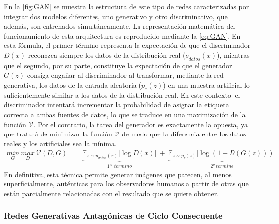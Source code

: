 En la \autoref{fig:GAN} se muestra la estructura de este tipo de redes caracterizadas por integrar dos modelos diferentes, uno generativo y otro discriminativo, que además, son entrenados simultáneamente. La representación matemática del funcionamiento de esta arquitectura es reproducido mediante la \autoref{eq:GAN}. En esta fórmula, el primer término representa la expectación de que el discriminador $D(x)$ reconozca siempre los datos de la distribución real ($p_{datos}(x)$), mientras que el segundo, por su parte, constituye la expectación de que el generador $G(z)$ consiga engañar al discriminador al transformar, mediante la red generativa, los datos de la entrada aleatoria ($p_z(z)$) en una muestra artificial lo suficientemente similar a los datos de la distribución real. En este contexto, el discriminador intentará incrementar la probabilidad de asignar la etiqueta correcta a ambas fuentes de datos, lo que se traduce en una maximización de la función $\mathcal{V}$. Por el contrario, la tarea del generador es exactamente la opuesta, ya que tratará de minimizar la función $\mathcal{V}$ de modo que la diferencia entre los datos reales y los artificiales sea la mínima.
\begin{align} \label{eq:GAN}
    \underset{G}{min} \ \underset{D}{max} \ \mathcal{V}(D, G) &= \underbrace{\mathbb{E}_{x\sim p_{datos}(x)} \big[\log D(x)\big]}_{1^{er} \ t\acute{e}rmino} \ + \ \underbrace{\mathbb{E}_{z\sim p_{z}(z)} \big[\log (1- D(G(z)))\big]}_{2^{o} \ t\acute{e}rmino}
\end{align}
En definitiva, esta técnica permite generar imágenes que parecen, al menos superficialmente, auténticas para los observadores humanos a partir de otras que están parcialmente relacionadas con el resultado que se quiere obtener.

\subsubsection{Redes Generativas Antagónicas de Ciclo Consecuente} \label{Chapter:CycleGan}

